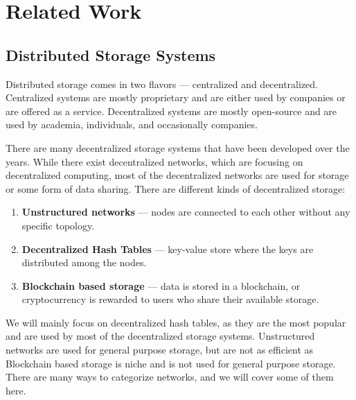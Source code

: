 \chapter{Related Work}
\label{chapter:related-work}

\section{Distributed Storage Systems}

Distributed storage comes in two flavors --- centralized and decentralized.
Centralized systems are mostly proprietary and are either used by companies or are offered as a service.
Decentralized systems are mostly open-source and are used by academia, individuals, and occasionally companies.

There are many decentralized storage systems that have been developed over the years.
While there exist decentralized networks, which are focusing on decentralized computing,
most of the decentralized networks are used for storage or some form of data sharing.
There are different kinds of decentralized storage:
\begin{enumerate}
    \item \textbf{Unstructured networks} --- nodes are connected to each other without any specific topology.
    \item \textbf{Decentralized Hash Tables} --- key-value store where the keys are distributed among the nodes.
    \item \textbf{Blockchain based storage} --- data is stored in a blockchain, or cryptocurrency
        is rewarded to users who share their available storage.
\end{enumerate}

We will mainly focus on decentralized hash tables, as they are the most popular and are used by
most of the decentralized storage systems.
Unstructured networks are used for general purpose storage, but are not as efficient as 
Blockchain based storage is niche and is not used for general purpose storage.
There are many ways to categorize networks, and we will cover some of them here.

